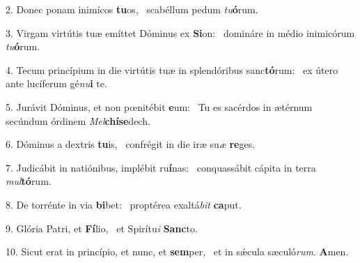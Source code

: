 2. Donec ponam inimícos \textbf{tu}os, \ast\  scabéllum pedum \textit{tu}\textbf{ó}rum.\

3. Virgam virtútis tuæ emíttet Dóminus ex \textbf{Si}on: \ast\  domináre in médio inimicórum \textit{tu}\textbf{ó}rum.\

4. Tecum princípium in die virtútis tuæ in splendóribus sanc\textbf{tó}rum: \ast\  ex útero ante lucíferum gé\textit{nu}\textbf{i} te.\

5. Jurávit Dóminus, et non pœnitébit \textbf{e}um: \ast\  Tu es sacérdos in ætérnum secúndum órdinem \textit{Mel}\textbf{chí}\textbf{se}dech.\

6. Dóminus a dextris \textbf{tu}is, \ast\  confrégit in die iræ su\textit{æ} \textbf{re}ges.\

7. Judicábit in natiónibus, implébit ru\textbf{í}nas: \ast\  conquassábit cápita in terra \textit{mul}\textbf{tó}rum.\

8. De torrénte in via \textbf{bi}bet: \ast\  proptérea exaltá\textit{bit} \textbf{ca}put.\

9. Glória Patri, et \textbf{Fí}lio, \ast\  et Spirítu\textit{i} \textbf{Sanc}to.\

10. Sicut erat in princípio, et nunc, et \textbf{sem}per, \ast\  et in sǽcula sæculó\textit{rum}. \textbf{A}men.\

